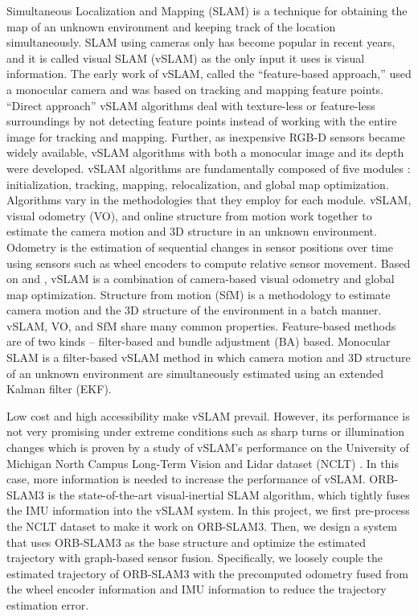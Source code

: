 \documentclass[letterpaper, 10 pt, conference]{ieeeconf}  %
\begin{document}
Simultaneous Localization and Mapping (SLAM) is a technique for obtaining the map of an unknown environment and keeping track of the location simultaneously. SLAM using cameras only has become popular in recent years, and it is called visual SLAM (vSLAM) as the only input it uses is visual information. The early work of vSLAM, called the “feature-based approach,” used a monocular camera and was based on tracking and mapping feature points. “Direct approach” vSLAM algorithms deal with texture-less or feature-less surroundings by not detecting feature points instead of working with the entire image for tracking and mapping. Further, as inexpensive RGB-D sensors became widely available, vSLAM algorithms with both a monocular image and its depth were developed. vSLAM algorithms are fundamentally composed of five modules \cite{intro}: initialization, tracking, mapping, relocalization, and global map optimization. Algorithms vary in the methodologies that they employ for each module. vSLAM, visual odometry (VO), and online structure from motion work together to estimate the camera motion and 3D structure in an unknown environment. Odometry is the estimation of sequential changes in sensor positions over time using sensors such as wheel encoders to compute relative sensor movement. Based on \cite{1} and \cite{2}, vSLAM is a combination of camera-based visual odometry and global map optimization. Structure from motion (SfM) is a methodology to estimate camera motion and the 3D structure of the environment in a batch manner. vSLAM, VO, and SfM share many common properties. Feature-based methods are of two kinds – filter-based and bundle adjustment (BA) based. Monocular SLAM is a filter-based vSLAM method in which camera motion and 3D structure of an unknown environment are simultaneously estimated using an extended Kalman filter (EKF).

Low cost and high accessibility make vSLAM prevail. However, its performance is not very promising under extreme conditions such as sharp turns or illumination changes which is proven by a study of vSLAM’s performance on the University of Michigan North Campus Long-Term Vision and Lidar dataset (NCLT) \cite{3}. In this case, more information is needed to increase the performance of vSLAM. ORB-SLAM3 \cite{orbslam3} is the state-of-the-art visual-inertial SLAM algorithm, which tightly fuses the IMU information into the vSLAM system. In this project, we first pre-process the NCLT dataset to make it work on ORB-SLAM3. Then, we design a system that uses ORB-SLAM3 \cite{orbslam3} as the base structure and optimize the estimated trajectory with graph-based sensor fusion. Specifically, we loosely couple the estimated trajectory of ORB-SLAM3 with the precomputed odometry fused from the wheel encoder information and IMU information to reduce the trajectory estimation error.
\end{document}

